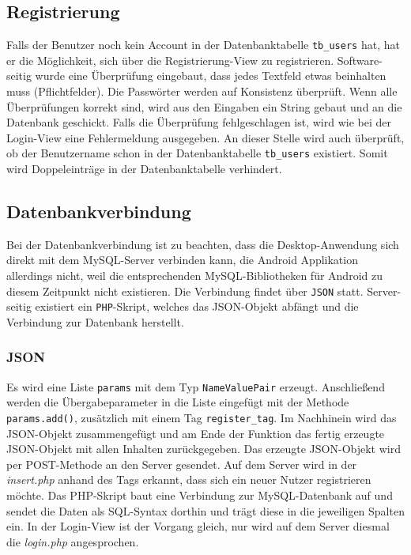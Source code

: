 \subsection{Registrierung}
Falls der Benutzer noch kein Account in der Datenbanktabelle \texttt{tb\_users} hat, hat er die Möglichkeit, sich über die Registrierung-View zu registrieren. Software-seitig wurde eine Überprüfung eingebaut, dass jedes Textfeld etwas beinhalten muss (Pflichtfelder). Die Passwörter werden auf Konsistenz überprüft. Wenn alle Überprüfungen korrekt sind, wird aus den Eingaben ein String gebaut und an die Datenbank geschickt. Falls die Überprüfung fehlgeschlagen ist, wird wie bei der Login-View eine Fehlermeldung ausgegeben. An dieser Stelle wird auch überprüft, ob der Benutzername schon in der Datenbanktabelle \texttt{tb\_users} existiert. Somit wird Doppeleinträge in der Datenbanktabelle verhindert.\\

\subsection{Datenbankverbindung}
Bei der Datenbankverbindung ist zu beachten, dass die Desktop-Anwendung sich direkt mit dem MySQL-Server verbinden kann, die Android Applikation allerdings nicht, weil die entsprechenden MySQL-Bibliotheken für Android zu diesem Zeitpunkt nicht existieren. Die Verbindung findet über \texttt{JSON} statt. Server-seitig existiert ein \texttt{PHP}-Skript, welches das JSON-Objekt abfängt und die Verbindung zur Datenbank herstellt.\\

\subsubsection{JSON}

Es wird eine Liste \texttt{params} mit dem Typ \texttt{NameValuePair} erzeugt. Anschließend werden die Übergabeparameter in die Liste eingefügt mit der Methode \texttt{params.add()}, zusätzlich mit einem Tag \texttt{register\_tag}. Im Nachhinein wird das JSON-Objekt zusammengefügt und am Ende der Funktion das fertig erzeugte JSON-Objekt mit allen Inhalten zurückgegeben. Das erzeugte JSON-Objekt wird per POST-Methode an den Server gesendet. Auf dem Server wird in der \textit{insert.php} anhand des Tags erkannt, dass sich ein neuer Nutzer registrieren möchte. Das PHP-Skript baut eine Verbindung zur MySQL-Datenbank auf und sendet die Daten als SQL-Syntax dorthin und trägt diese in die jeweiligen Spalten ein. In der Login-View ist der Vorgang gleich, nur wird auf dem Server diesmal die \textit{login.php} angesprochen.\\


